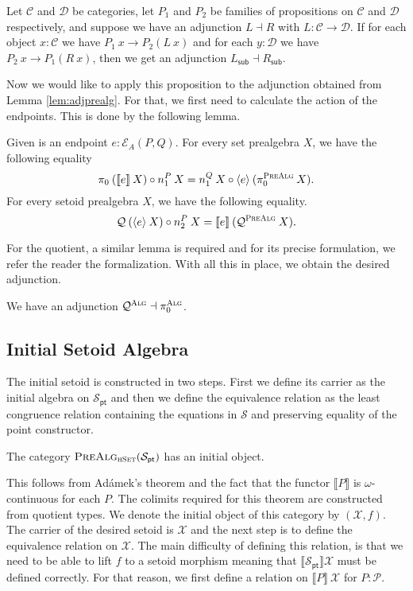 \documentclass[9pt]{entcs}
\newcommand{\type}[1]{\textsc{#1}}
\newcommand{\category}[1]{\textsc{#1}}
\newcommand{\function}[1]{\mathsf{#1}}
\newcommand{\hset}{\type{hSet}} %
\newcommand{\0}{\textbf{0}} %
\newcommand{\compm}[2]{#2 \circ #1} %
\newcommand{\functor}[2]{#1 \longrightarrow #2} %
\newcommand{\adj}[2]{#1 \dashv #2} %
\newcommand{\factorsub}[1]{#1_{\function{sub}}} %
\newcommand{\poly}{\mathcal{P}} %
\newcommand{\ep}[3]{\mathcal{E}_{#1}(#2,#3)} %
\newcommand{\pt}[0]{\textsf{pt}}
\newcommand{\pointc}[1]{#1_{\pt}} %
\newcommand{\sig}{\mathcal{S}} %
\newcommand{\semP}[1]{\llbracket #1 \rrbracket} %
\newcommand{\prealg}[1]{\category{PreAlg}_{\hset}(#1)} %
\newcommand{\semE}[1]{\llbracket #1 \rrbracket} %
\newcommand{\semET}[1]{\langle #1 \rangle} %
\newcommand{\quotF}{\mathcal{Q}}
\newcommand{\pathF}{\pi_0}
\newcommand{\quotPA}{\mathcal{Q}^{\category{PreAlg}}}
\newcommand{\pathPA}{\pi^{\category{PreAlg}}_0}
\newcommand{\quotAA}{\mathcal{Q}^{\category{Alg}}}
\newcommand{\pathAA}{\pi_0^{\category{Alg}}}
\newcommand{\CRC}{\mathcal{X}} %
\begin{document}
\begin{proposition}
Let $\mathcal{C}$ and $\mathcal{D}$ be categories, let $P_1$ and $P_2$ be families of propositions on $\mathcal{C}$ and $\mathcal{D}$ respectively, and suppose we have an adjunction $\adj{L}{R}$ with $L : \functor{\mathcal{C}}{\mathcal{D}}$.
If for each object $x : \mathcal{C}$ we have $P_1 \> x \rightarrow P_2(L \> x)$ and for each $y : \mathcal{D}$ we have $P_2 \> x \rightarrow P_1(R \> x)$, then we get an adjunction $\adj{\factorsub{L}}{\factorsub{R}}$.
\end{proposition}

Now we would like to apply this proposition to the adjunction obtained from Lemma \ref{lem:adjprealg}.
For that, we first need to calculate the action of the endpoints.
This is done by the following lemma.

\begin{lemma}
Given is an endpoint $e : \ep{A}{P}{Q}$.
For every set prealgebra $X$, we have the following equality
\[
\compm{n_1^P \> X}{\pathF \> (\semE{e} \> X)} = \compm{\semET{e} \> (\pathPA \> X)}{n_1^Q \> X}.
\]
For every setoid prealgebra $X$, we have the following equality.
\[
\compm{n_2^P \> X}{\quotF \> (\semET{e} \> X)} = \semE{e} \> (\quotPA \> X).
\]
\end{lemma}

For the quotient, a similar lemma is required and for its precise formulation, we refer the reader the formalization.
With all this in place, we obtain the desired adjunction.

\begin{theorem}
\label{thm:algadj}
We have an adjunction $\adj{\quotAA}{\pathAA}$.
\end{theorem}

\subsection{Initial Setoid Algebra}
The initial setoid is constructed in two steps.
First we define its carrier as the initial algebra on $\pointc{\sig}$ and then we define the equivalence relation as the least congruence relation containing the equations in $\sig$ and preserving equality of the point constructor.

\begin{lemma}
The category $\prealg{\pointc{\sig}}$ has an initial object.
\end{lemma}

This follows from Ad\'amek's theorem and the fact that the functor $\semP{P}$ is $\omega$-continuous for each $P$.
The colimits required for this theorem are constructed from quotient types.
We denote the initial object of this category by $(\CRC , f)$.
The carrier of the desired setoid is $\CRC$ and the next step is to define the equivalence relation on $\CRC$.
The main difficulty of defining this relation, is that we need to be able to lift $f$ to a setoid morphism meaning that $\semP{\pointc{\sig}}{\CRC}$ must be defined correctly.
For that reason, we first define a relation on $\semP{P} \> \CRC$ for $P : \poly$.
\end{document}
